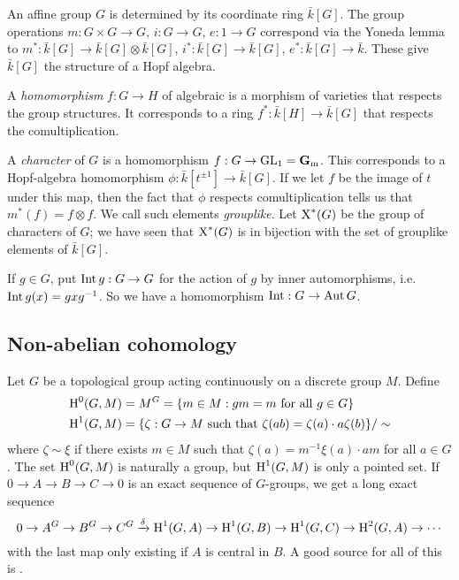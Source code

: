 An affine group $G$ is determined by its coordinate ring $\bar k[G]$. The 
group operations $m:G\times G\to G$, $i:G\to G$, $e:1\to G$ correspond via 
the Yoneda lemma to $m^\ast:\bar k[G]\to \bar k[G]\otimes \bar k[G]$, 
$i^\ast:\bar k[G] \to \bar k[G]$, $e^\ast:\bar k[G] \to \bar k$. These give 
$\bar k[G]$ the structure of a Hopf algebra. 

A \emph{homomorphism} $f:G\to H$ of algebraic is a morphism of varieties that 
respects the group structures. It corresponds to a ring 
$f^\ast:\bar k[H] \to \bar k[G]$ that respects the comultiplication.

A \emph{character} of $G$ is a homomorphism 
$f:G\to \operatorname{GL}_1 = \mathbf{G}_{\mathrm{m}}$. This corresponds to a 
Hopf-algebra homomorphism $\phi:\bar k[t^{\pm 1}] \to \bar k[G]$. If we let $f$ 
be the image of $t$ under this map, then the fact that $\phi$ respects 
comultiplication tells us that $m^\ast(f) = f\otimes f$. We call such 
elements \emph{grouplike}. Let $\operatorname{X}^\ast(G)$ be the group of characters 
of $G$; we have seen that $\operatorname{X}^\ast(G)$ is in bijection with the set 
of grouplike elements of $\bar k[G]$. 

If $g\in G$, put $\operatorname{Int} g:G\to G$ for the action of $g$ by inner 
automorphisms, i.e.\ $\operatorname{Int} g(x) = g x g^{-1}$. So we have a homomorphism 
$\operatorname{Int}:G\to \operatorname{Aut} G$. 





\subsection{Non-abelian cohomology}

Let $G$ be a topological group acting continuously on a discrete group $M$. 
Define 
\begin{align*}
  \operatorname{H}^0(G,M) &= M^G = \{m\in M:g m=m\text{ for all }g\in G\} \\
  \operatorname{H}^1(G,M) &= \{\zeta:G\to M\text{ such that }\zeta(a b) = \zeta(a)\cdot a \zeta(b)\} / \sim 
\end{align*}
where $\zeta\sim \xi$ if there exists $m\in M$ such that 
$\zeta(a) = m^{-1} \xi(a) \cdot a m$ for all $a\in G$. The set $\operatorname{H}^0(G,M)$ is 
naturally a group, but $\operatorname{H}^1(G,M)$ is only a pointed set. If 
$0 \to A \to B \to C \to 0$ is an exact sequence of $G$-groups, we get a long 
exact sequence 
\[
  0 \to A^G \to B^G \to C^G \xrightarrow\delta \operatorname{H}^1(G,A) \to \operatorname{H}^1(G,B) \to \operatorname{H}^1(G,C) \to \operatorname{H}^2(G,A) \to \cdots 
\]
with the last map only existing if $A$ is central in $B$. A good source for all 
of this is \cite{s79}. 

